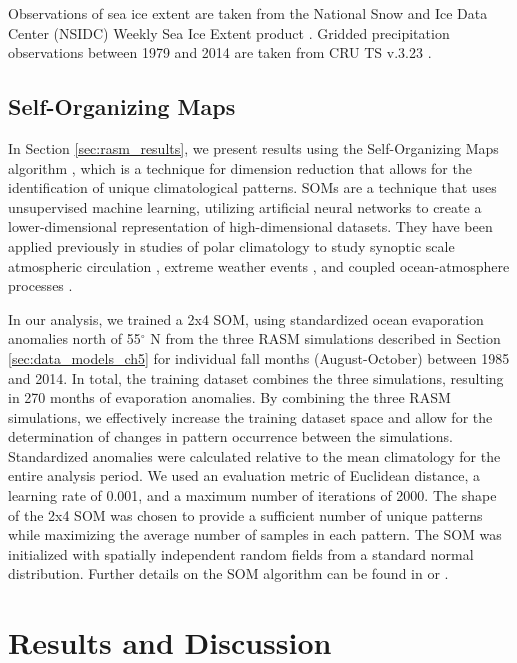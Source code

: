 \documentclass[draft,linenumbers]{agujournal}
\begin{document}
Observations of sea ice extent are taken from the National Snow and Ice Data Center (NSIDC) Weekly Sea Ice Extent product \citep{Brodzik_2013}.
Gridded precipitation observations between 1979 and 2014 are taken from CRU TS v.3.23 \citep{Harris_2014}.

\subsection{Self-Organizing Maps}
In Section \ref{sec:rasm_results}, we present results using the Self-Organizing Maps algorithm \citep[SOMs;][]{Kohonen_1998,Hewitson_2002}, which is a technique for dimension reduction that allows for the identification of unique climatological patterns.
SOMs are a technique that uses unsupervised machine learning, utilizing artificial neural networks to create a lower-dimensional representation of high-dimensional datasets.
They have been applied previously in studies of polar climatology to study synoptic scale atmospheric circulation \citep[e.g.][]{Cassano_2007}, extreme weather events \citep[e.g.][]{Cassano_2015,Glisan_2016}, and coupled ocean-atmosphere processes \citep[e.g.][]{DuVivier_2016}.

In our analysis, we trained a 2x4 SOM, using standardized ocean evaporation anomalies north of 55$^{\circ}$ N from the three RASM simulations described in Section \ref{sec:data_models_ch5} for individual fall months (August-October) between 1985 and 2014.
In total, the training dataset combines the three simulations, resulting in 270 months of evaporation anomalies.
By combining the three RASM simulations, we effectively increase the training dataset space and allow for the determination of changes in pattern occurrence between the simulations.
Standardized anomalies were calculated relative to the mean climatology for the entire analysis period.
We used an evaluation metric of Euclidean distance, a learning rate of 0.001, and a maximum number of iterations of 2000.
The shape of the 2x4 SOM was chosen to provide a sufficient number of unique patterns while maximizing the average number of samples in each pattern.
The SOM was initialized with spatially independent random fields from a standard normal distribution.
Further details on the SOM algorithm can be found in \citet{Reusch_2005} or \citet{Cassano_2015}.

\section{Results and Discussion}
\label{sec:results_ch5}
\end{document}
